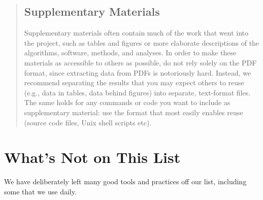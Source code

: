 \documentclass[10pt]{article}
\begin{document}
\begin{quote}
\subsection*{Supplementary Materials}

Supplementary materials often contain much of the work that went into
the project, such as tables and figures or more elaborate descriptions
of the algorithms, software, methods, and analyses. In order to make
these materials as accessible to others as possible, do not rely solely
on the PDF format, since extracting data from PDFs is notoriously hard.
Instead, we recommend separating the results that you may expect others
to reuse (e.g., data in tables, data behind figures) into separate,
text-format files. The same holds for any commands or code you want to
include as supplementary material: use the format that most easily
enables reuse (source code files, Unix shell scripts etc).
\end{quote}

\section{What's Not on This List}\label{whats-not-on-this-list}

We have deliberately left many good tools and practices off our list,
including some that we use daily.
\end{document}
